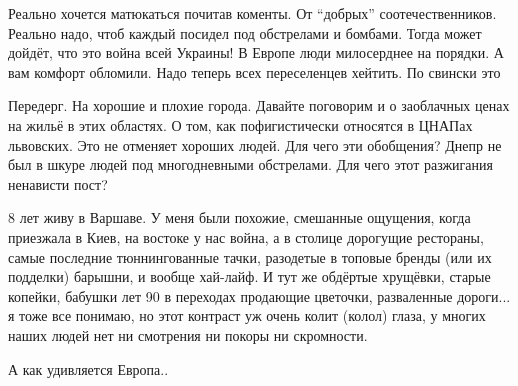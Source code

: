 \begin{itemize}

Реально хочется матюкаться почитав коменты. От \enquote{добрых} соотечественников.
Реально надо, чтоб каждый посидел под обстрелами и бомбами. Тогда может дойдёт,
что это война всей Украины! В Европе люди милосерднее на порядки. А вам комфорт
обломили. Надо теперь всех переселенцев хейтить. По свински это


Передерг. На хорошие и плохие города. Давайте поговорим и о заоблачных ценах на
жильё в этих областях. О том, как пофигистически относятся в ЦНАПах львовских.
Это не отменяет хороших людей. Для чего эти обобщения? Днепр не был в шкуре
людей под многодневными обстрелами. Для чего этот разжигания ненависти пост?


8 лет живу в Варшаве. У меня были похожие, смешанные ощущения, когда приезжала
в Киев, на востоке у нас война, а в столице дорогущие рестораны, самые
последние тюннингованные тачки, разодетые в топовые бренды (или их подделки)
барышни, и вообще хай-лайф. И тут же обдёртые хрущёвки, старые копейки, бабушки
лет 90 в переходах продающие цветочки, разваленные дороги... я тоже все понимаю,
но этот контраст уж очень колит (колол) глаза, у многих наших людей нет ни
смотрения ни покоры ни скромности.

А как удивляется Европа..

\end{itemize} %

